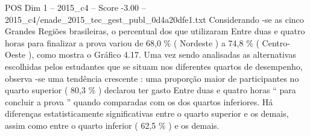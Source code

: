 \begin{textsample}{POS Dim 1 – 2015\_c4 – Score -3.00 – 2015\_c4/enade\_2015\_tec\_gest\_publ\_0d4a20dfe1.txt}
Considerando -se as cinco Grandes Regiões brasileiras, o percentual dos que utilizaram Entre duas e quatro horas para finalizar a prova variou de 68,0 \% ( Nordeste ) a 74,8 \% ( Centro-Oeste ), como mostra o Gráfico 4.17.
Uma vez sendo analisadas as alternativas escolhidas pelos estudantes que se situam nos diferentes quartos de desempenho, observa -se uma tendência crescente : uma proporção maior de participantes no quarto superior ( 80,3 \% ) declarou ter gasto Entre duas e quatro horas “ para concluir a prova ” quando comparadas com os dos quartos inferiores.
Há diferenças estatisticamente significativas entre o quarto superior e os demais, assim como entre o quarto inferior ( 62,5 \% ) e os demais.

\end{textsample}
